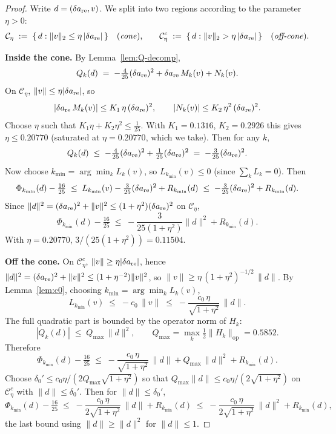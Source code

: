 \documentclass[11pt,a4paper]{article}
\begin{document}
\begin{proof}
Write $d=(\delta a_{\rm re},v)$. We split into two regions according to
the parameter $\eta>0$:
\[
\mathcal{C}_\eta \;:=\; \{\,d : \|v\|_2 \le \eta\,|\delta a_{\rm re}|\,\}
\quad\text{(\emph{cone}),}
\qquad
\mathcal{C}_\eta^c \;:=\; \{\,d : \|v\|_2 > \eta\,|\delta a_{\rm re}|\,\}
\quad\text{(\emph{off-cone}).}
\]

\medskip
\noindent\textbf{Inside the cone.}
By Lemma~\ref{lem:Q-decomp},
\[
Q_k(d) \;=\; -\tfrac{4}{25}(\delta a_{\rm re})^2
        + \delta a_{\rm re}\,M_k(v) + N_k(v).
\]
On $\mathcal C_\eta$, $\|v\|\le\eta|\delta a_{\rm re}|$, so
\[
|\delta a_{\rm re}\,M_k(v)|\le K_1\,\eta\,(\delta a_{\rm re})^2,
\qquad
|N_k(v)|\le K_2\,\eta^2\,(\delta a_{\rm re})^2.
\]
Choose $\eta$ such that $K_1\eta + K_2\eta^2 \le \tfrac{1}{25}$.
With $K_1=0.1316$, $K_2=0.2926$ this gives $\eta\le 0.20770$ (saturated
at $\eta = 0.20770$, which we take). Then for any $k$,
\[
Q_k(d) \;\le\; -\tfrac{4}{25}(\delta a_{\rm re})^2
        + \tfrac{1}{25}(\delta a_{\rm re})^2
        \;=\; -\tfrac{3}{25}(\delta a_{\rm re})^2.
\]
Now choose $k_{\min} = \arg\min_k L_k(v)$, so $L_{k_{\min}}(v)\le 0$
(since $\sum_k L_k=0$). Then
\[
\Phi_{k_{\min}}(d) - \tfrac{16}{25}
\;\le\; L_{k_{\min}}(v) - \tfrac{3}{25}(\delta a_{\rm re})^2 + R_{k_{\min}}(d)
\;\le\; -\tfrac{3}{25}(\delta a_{\rm re})^2 + R_{k_{\min}}(d).
\]
Since $\|d\|^2 = (\delta a_{\rm re})^2 + \|v\|^2 \le (1+\eta^2)(\delta a_{\rm re})^2$
on $\mathcal{C}_\eta$,
\[
\Phi_{k_{\min}}(d) - \tfrac{16}{25}
\;\le\; -\frac{3}{25(1+\eta^2)}\|d\|^2 + R_{k_{\min}}(d).
\]
With $\eta = 0.20770$, $3/(25(1+\eta^2)) = 0.11504$.

\medskip
\noindent\textbf{Off the cone.}
On $\mathcal C_\eta^c$, $\|v\|\ge \eta|\delta a_{\rm re}|$, hence
$\|d\|^2 = (\delta a_{\rm re})^2 + \|v\|^2 \le (1+\eta^{-2})\|v\|^2$, so
$\|v\|\ge \eta\,(1+\eta^2)^{-1/2}\,\|d\|$.
By Lemma~\ref{lem:c0}, choosing $k_{\min}=\arg\min_k L_k(v)$,
\[
L_{k_{\min}}(v) \;\le\; -c_0 \,\|v\| \;\le\; -\frac{c_0\,\eta}{\sqrt{1+\eta^2}}\,\|d\|.
\]
The full quadratic part is bounded by the operator norm of $H_k$:
\[
|Q_k(d)| \;\le\; Q_{\max}\,\|d\|^2,
\qquad Q_{\max} = \max_k \tfrac12\|H_k\|_{\mathrm{op}} = 0.5852.
\]
Therefore
\[
\Phi_{k_{\min}}(d) - \tfrac{16}{25}
\;\le\; -\frac{c_0\,\eta}{\sqrt{1+\eta^2}}\,\|d\|
       + Q_{\max}\,\|d\|^2 + R_{k_{\min}}(d).
\]
Choose $\delta_0' \le c_0\eta/(2 Q_{\max}\sqrt{1+\eta^2})$ so that
$Q_{\max}\|d\| \le c_0\eta/(2\sqrt{1+\eta^2})$ on $\mathcal C_\eta^c$
with $\|d\|\le\delta_0'$. Then for $\|d\|\le\delta_0'$,
\[
\Phi_{k_{\min}}(d) - \tfrac{16}{25}
\;\le\; -\frac{c_0\,\eta}{2\sqrt{1+\eta^2}}\,\|d\|
       + R_{k_{\min}}(d)
\;\le\; -\frac{c_0\,\eta}{2\sqrt{1+\eta^2}}\,\|d\|^2 + R_{k_{\min}}(d),
\]
the last bound using $\|d\|\ge\|d\|^2$ for $\|d\|\le 1$.


\end{proof}
\end{document}
